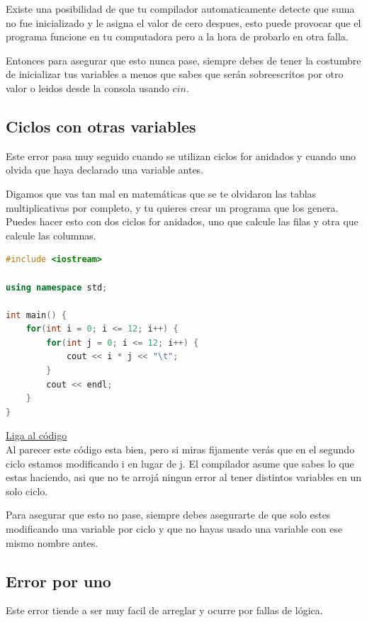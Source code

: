 \documentclass{article}
\begin{document}
Existe una posibilidad de que tu compilador automaticamente detecte que suma no fue inicializado y le asigna el valor de cero despues, esto puede provocar que el programa funcione en tu computadora pero a la hora de probarlo en otra falla.

Entonces para asegurar que esto nunca pase, siempre debes de tener la costumbre de inicializar tus variables a menos que sabes que serán sobreescritos por otro valor o leidos desde la consola usando $cin$.

\subsection{Ciclos con otras variables}
Este error pasa muy seguido cuando se utilizan ciclos for anidados y cuando uno olvida que haya declarado una variable antes.

Digamos que vas tan mal en matemáticas que se te olvidaron las tablas multiplicativas por completo, y tu quieres crear un programa que los genera. Puedes hacer esto con dos ciclos for anidados, uno que calcule las filas y otra que calcule las columnas.

\begin{lstlisting}[language=C++, caption=Ciclos con otras variables]
#include <iostream>

using namespace std;

int main() {
    for(int i = 0; i <= 12; i++) {
        for(int j = 0; i <= 12; i++) {
            cout << i * j << "\t";
        }
        cout << endl;
    }
}
\end{lstlisting}
\href{https://repl.it/@Jamesscn/Tablas-de-Falsedad}{Liga al código}\\

Al parecer este código esta bien, pero si miras fijamente verás que en el segundo ciclo estamos modificando i en lugar de j. El compilador asume que sabes lo que estas haciendo, asi que no te arrojá ningun error al tener distintos variables en un solo ciclo.

Para asegurar que esto no pase, siempre debes asegurarte de que solo estes modificando una variable por ciclo y que no hayas usado una variable con ese mismo nombre antes.

\subsection{Error por uno}
Este error tiende a ser muy facil de arreglar y ocurre por fallas de lógica.
\end{document}
